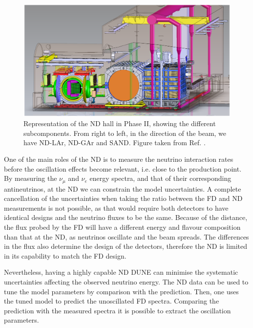 \begin{figure}[t]
	\centering
	\includegraphics[width=0.95\linewidth]{Images/DUNE/ND/nd_hall}
	\caption[Representation of the ND hall in Phase II, showing the different subcomponents.]{Representation of the ND hall in Phase II, showing the different subcomponents. From right to left, in the direction of the beam, we have ND-LAr, ND-GAr and SAND. Figure taken from Ref. \cite{DUNE2021NDCDR}.}
	\label{fig:dune_nd}
\end{figure}

One of the main roles of the ND is to measure the neutrino interaction rates before the oscillation effects become relevant, i.e. close to the production point. By measuring the $\nu_{\mu}$ and $\nu_{e}$ energy spectra, and that of their corresponding antineutrinos, at the ND we can constrain the model uncertainties. A complete cancellation of the uncertainties when taking the ratio between the FD and ND measurements is not possible, as that would require both detectors to have identical designs and the neutrino fluxes to be the same. Because of the distance, the flux probed by the FD will have a different energy and flavour composition than that at the ND, as neutrinos oscillate and the beam spreads. The differences in the flux also determine the design of the detectors, therefore the ND is limited in its capability to match the FD design.

Nevertheless, having a highly capable ND DUNE can minimise the systematic uncertainties affecting the observed neutrino energy. The ND data can be used to tune the model parameters by comparison with the prediction. Then, one uses the tuned model to predict the unoscillated FD spectra. Comparing the prediction with the measured spectra it is possible to extract the oscillation parameters.

